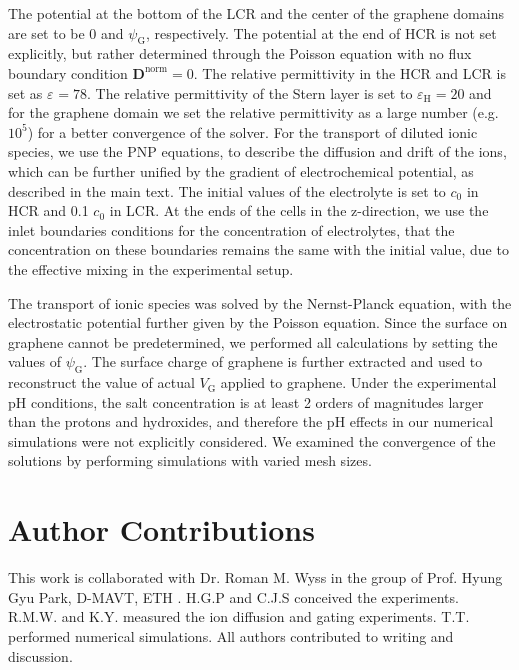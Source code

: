 The potential at the
bottom of the LCR and the center of the graphene domains are set to be
0 and $\psi_{\mathrm{G}}$, respectively. The potential at the end of
HCR is not set explicitly, but rather determined through the Poisson
equation with no flux boundary condition
$\symbf{D}^{\mathrm{norm}}=0$. The relative permittivity in the
HCR and LCR is set as $\varepsilon_{\mathrm{}}=78$. The relative
permittivity of the Stern layer is set to
$\varepsilon_{\mathrm{H}}=20$\autocite{Conway_1951_dielectric_Helmholtz} and for the graphene
domain we set the relative permittivity as a large number
(e.g. $10^{5}$) for a better convergence of the solver.  For the
transport of diluted ionic species, we use the PNP equations, to
describe the diffusion and drift of the ions, which can be further
unified by the gradient of electrochemical potential, as described in
the main text. The initial values of the electrolyte is set to $c_{0}$
in HCR and 0.1 $c_{0}$ in LCR. At the ends of the cells in the
z-direction, we use the inlet boundaries conditions for the
concentration of electrolytes, that the concentration on these
boundaries remains the same with the initial value, due to the
effective mixing in the experimental setup.

The
transport of ionic species was solved by the Nernst-Planck equation,
with the electrostatic potential further given by the Poisson
equation. Since the surface on graphene cannot be predetermined, we
performed all calculations by setting the values of
$\psi_{\mathrm{G}}$. The surface charge of graphene is further
extracted and used to reconstruct the value of actual $V_{\mathrm{G}}$
applied to graphene.  Under the experimental pH conditions, the salt
  concentration is at least 2 orders of magnitudes larger than the
  protons and hydroxides, and therefore the pH effects in our
  numerical simulations were not explicitly considered.  We examined
the convergence of the solutions by performing simulations with varied
mesh sizes. 



\section{Author Contributions}
\label{sec:np-np-author-contrib}

This work is collaborated with Dr. Roman M. Wyss in the group of
Prof. Hyung Gyu Park, D-MAVT, ETH \zurich{}.  H.G.P and C.J.S
conceived the experiments. R.M.W. and K.Y. measured the ion diffusion
and gating experiments. T.T. performed numerical simulations. All
authors contributed to writing and discussion.

























